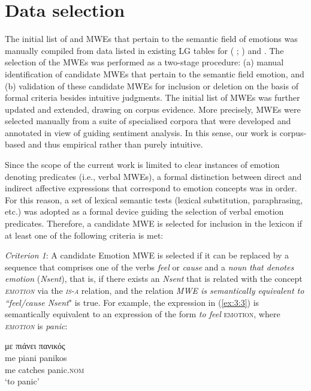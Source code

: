 \documentclass[output=paper]{langsci/langscibook}
\begin{document}
\section{Data selection}


The initial list of  and  MWEs that pertain to the semantic field of
emotions was manually compiled from data listed in existing LG tables
for  (\citeauthor{fotopoulou1993} \citeyear*{fotopoulou1993}; \citealt{Mini2009}) and  \citep{gross1982}. The selection of the  MWEs was performed as a two-stage
procedure: (a) manual identification of candidate MWEs that pertain to
the semantic field emotion, and (b) validation of these candidate MWEs
for inclusion or deletion on the basis of formal criteria besides
intuitive judgments. The initial list of MWEs was further updated and
extended, drawing on corpus evidence. More precisely,  MWEs were
selected manually from a suite of specialised corpora \citep{giouli2014} that were developed and annotated in view of guiding
sentiment analysis. In this sense, our work is corpus-based and thus
empirical rather than purely intuitive.



Since the scope of the current work is limited to clear instances of
emotion denoting predicates (i.e., verbal MWEs), a formal distinction
between direct and indirect affective expressions that correspond to
emotion concepts was in order. For this reason, a set of lexical
semantic tests (lexical substitution, paraphrasing, etc.) was adopted as
a formal device guiding the selection of  verbal emotion predicates.
Therefore, a candidate MWE is selected for inclusion in the
lexicon if at least one of the following criteria is met:


\textit{Criterion 1}: A candidate Emotion MWE is selected if it can be replaced by a sequence
that comprises one of the verbs \textit{feel} or
\textit{cause} and a \textit{noun that denotes
emotion} (\textit{Nsent}), that is, if there exists an \textit{Nsent}
that is related with the concept \textit{\textsc{emotion}}
via the \textit{\textsc{is-a}} relation, and the relation
\textit{MWE is semantically equivalent to ``feel/cause Nsent}" is true. For example, the
expression in (\ref{ex:3:3}) is semantically equivalent to an expression of the
form \textit{to feel} \textsc{emotion}, where
\textit{\textsc{emotion}} is \textit{panic}:

\begin{exe}
\ex \label{ex:3:3}
\glll με πιάνει πανικός \\
me piani panikos\\
me catches panic.\textsc{nom}\\
\glt %
‘to panic’
\end{exe}
\end{document}
